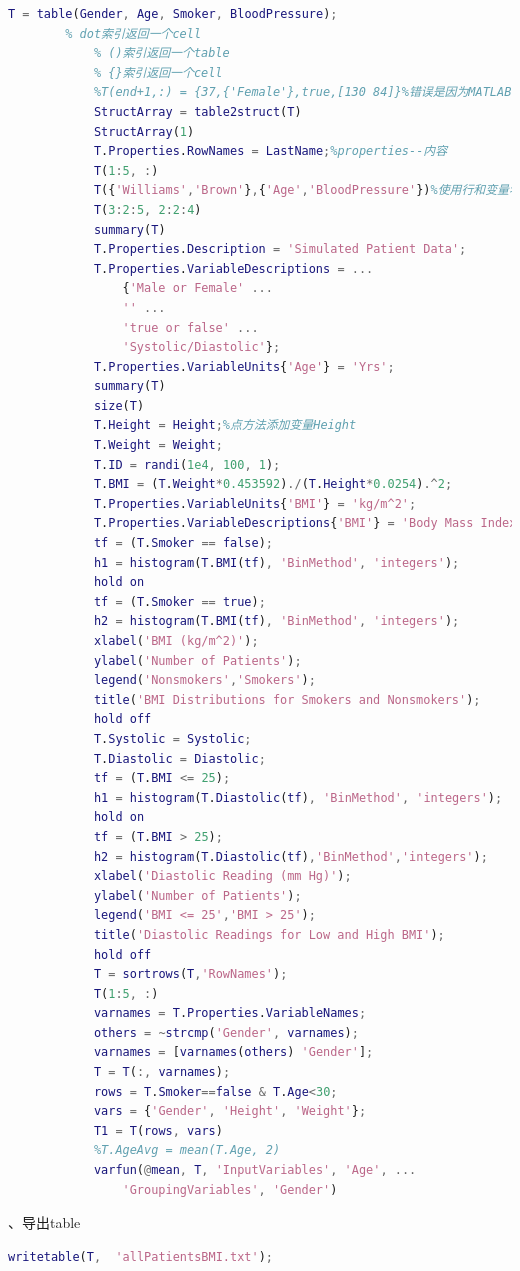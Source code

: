             \begin{lstlisting}[language=Matlab]
            T = table(Gender, Age, Smoker, BloodPressure);
	    % dot索引返回一个cell
            % ()索引返回一个table
            % {}索引返回一个cell
            %T(end+1,:) = {37,{'Female'},true,[130 84]}%错误是因为MATLAB不能分配数值数据到分类数组、性别。
            StructArray = table2struct(T)
            StructArray(1)
            T.Properties.RowNames = LastName;%properties--内容
            T(1:5, :)
            T({'Williams','Brown'},{'Age','BloodPressure'})%使用行和变量名称来访问数据
            T(3:2:5, 2:2:4)
            summary(T)
            T.Properties.Description = 'Simulated Patient Data';
            T.Properties.VariableDescriptions = ...
                {'Male or Female' ...
                '' ...
                'true or false' ...
                'Systolic/Diastolic'};
            T.Properties.VariableUnits{'Age'} = 'Yrs';
            summary(T)
            size(T)
            T.Height = Height;%点方法添加变量Height
            T.Weight = Weight;
            T.ID = randi(1e4, 100, 1);
            T.BMI = (T.Weight*0.453592)./(T.Height*0.0254).^2;
            T.Properties.VariableUnits{'BMI'} = 'kg/m^2';
            T.Properties.VariableDescriptions{'BMI'} = 'Body Mass Index';
            tf = (T.Smoker == false);
            h1 = histogram(T.BMI(tf), 'BinMethod', 'integers');
            hold on
            tf = (T.Smoker == true);
            h2 = histogram(T.BMI(tf), 'BinMethod', 'integers');
            xlabel('BMI (kg/m^2)');
            ylabel('Number of Patients');
            legend('Nonsmokers','Smokers');
            title('BMI Distributions for Smokers and Nonsmokers');
            hold off
            T.Systolic = Systolic;
            T.Diastolic = Diastolic;
            tf = (T.BMI <= 25);
            h1 = histogram(T.Diastolic(tf), 'BinMethod', 'integers');
            hold on
            tf = (T.BMI > 25);
            h2 = histogram(T.Diastolic(tf),'BinMethod','integers');
            xlabel('Diastolic Reading (mm Hg)');
            ylabel('Number of Patients');
            legend('BMI <= 25','BMI > 25');
            title('Diastolic Readings for Low and High BMI');
            hold off
            T = sortrows(T,'RowNames');
            T(1:5, :)
            varnames = T.Properties.VariableNames;
            others = ~strcmp('Gender', varnames);
            varnames = [varnames(others) 'Gender'];
            T = T(:, varnames);
            rows = T.Smoker==false & T.Age<30;
            vars = {'Gender', 'Height', 'Weight'};
            T1 = T(rows, vars)
            %T.AgeAvg = mean(T.Age, 2)
            varfun(@mean, T, 'InputVariables', 'Age', ...
                'GroupingVariables', 'Gender')
                \end{lstlisting}
            、导出table
            \begin{lstlisting}[language=Matlab]
            writetable(T,  'allPatientsBMI.txt');
            \end{lstlisting}

